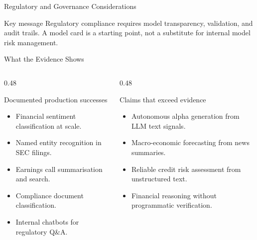 \documentclass[11pt,aspectratio=169,professionalfonts]{beamer}
\begin{document}
%
%
\begin{frame}{Regulatory and Governance Considerations}
  \vspace{0.4em}
  \begin{alertblock}{Key message}
    Regulatory compliance requires model transparency, validation,
    and audit trails.
    A model card is a starting point,
    not a substitute for internal model risk management.
  \end{alertblock}
\end{frame}
%
%
\begin{frame}{What the Evidence Shows}
  \begin{columns}[T]
    \begin{column}{0.48\linewidth}
      \begin{block}{Documented production successes}
        \begin{itemize}
          \item Financial sentiment classification at scale.
          \item Named entity recognition in SEC filings.
          \item Earnings call summarisation and search.
          \item Compliance document classification.
          \item Internal chatbots for regulatory Q\&A.
        \end{itemize}
      \end{block}
    \end{column}
    \begin{column}{0.48\linewidth}
      \begin{alertblock}{Claims that exceed evidence}
        \begin{itemize}
          \item Autonomous alpha generation from LLM text signals.
          \item Macro-economic forecasting from news summaries.
          \item Reliable credit risk assessment from unstructured text.
          \item Financial reasoning without programmatic verification.
        \end{itemize}
      \end{alertblock}
    \end{column}
  \end{columns}
\end{frame}
%
\end{document}
